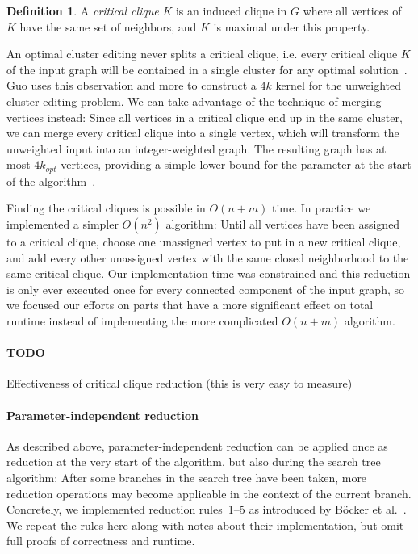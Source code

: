 \documentclass{article}
\newcommand{\todo}[1]{\paragraph{TODO} #1}
\theoremstyle{definition}
\newtheorem{definition}[theorem]{Definition}
\begin{document}
\begin{definition}
	A \emph{critical clique} $K$ is an induced clique in $G$ where all vertices of $K$ have the same
	set of neighbors, and $K$ is maximal under this property. 
\end{definition}

An optimal cluster editing never splits a critical clique, i.e. every critical clique $K$ of the
input graph will be contained in a single cluster for any optimal solution~\cite{Guo}. Guo uses this
observation and more to construct a $4k$ kernel for the unweighted cluster editing problem. We can
take advantage of the technique of merging vertices instead: Since all vertices in a critical clique
end up in the same cluster, we can merge every critical clique into a single vertex, which will
transform the unweighted input into an integer-weighted graph. The resulting graph has at most
$4k_{opt}$ vertices, providing a simple lower bound for the parameter at the start of the
algorithm~\cite{GoingWeighted}\cite{Guo}.

Finding the critical cliques is possible in $O(n + m)$ time. In practice we implemented a simpler
$O(n^2)$ algorithm: Until all vertices have been assigned to a critical clique, choose one
unassigned vertex to put in a new critical clique, and add every other unassigned vertex with the
same closed neighborhood to the same critical clique. Our implementation time was constrained and
this reduction is only ever executed once for every connected component of the input graph, so we
focused our efforts on parts that have a more significant effect on total runtime instead of
implementing the more complicated $O(n + m)$ algorithm.

\todo Effectiveness of critical clique reduction (this is very easy to measure)

\paragraph{Parameter-independent reduction} As described above, parameter-independent reduction can
be applied once as reduction at the very start of the algorithm, but also during the search tree
algorithm: After some branches in the search tree have been taken, more reduction operations may
become applicable in the context of the current branch. Concretely, we implemented reduction
rules~1--5 as introduced by Böcker et al.~\cite{GoingWeighted}. We repeat the rules here along with
notes about their implementation, but omit full proofs of correctness and runtime.
\end{document}
